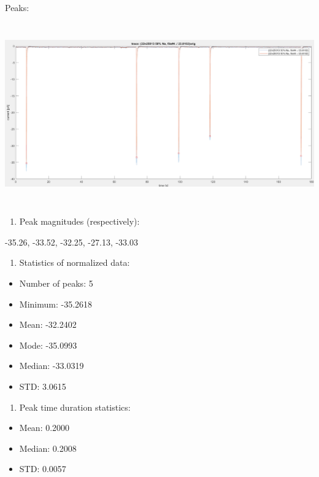 Peaks:

\includegraphics[width=6.5in,height=3.08333in]{media/image5.png}

\begin{enumerate}
\def\labelenumi{\arabic{enumi}.}
\item
  Peak magnitudes (respectively):
\end{enumerate}

-35.26, -33.52, -32.25, -27.13, -33.03

\begin{enumerate}
\def\labelenumi{\arabic{enumi}.}
\setcounter{enumi}{1}
\item
  Statistics of normalized data:
\end{enumerate}

\begin{itemize}
\item
  Number of peaks: 5
\item
  Minimum: -35.2618
\item
  Mean: -32.2402
\item
  Mode: -35.0993
\item
  Median: -33.0319
\item
  STD: 3.0615
\end{itemize}

\begin{enumerate}
\def\labelenumi{\arabic{enumi}.}
\setcounter{enumi}{2}
\item
  Peak time duration statistics:
\end{enumerate}

\begin{itemize}
\item
  Mean: 0.2000
\item
  Median: 0.2008
\item
  STD: 0.0057
\end{itemize}

